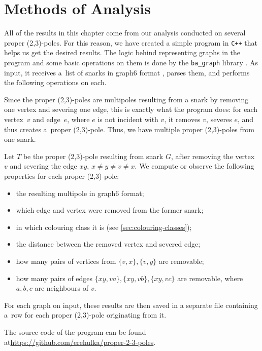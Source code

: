 \section{Methods of Analysis}\label{sec:analysis}

All of the results in this chapter come from our analysis conducted on several proper (2,3)-poles. For this reason, we have created a simple program in \texttt{C++} that helps us get the desired results. The logic behind representing graphs in the program and some basic operations on them is done by the \texttt{ba\_graph} library \cite{ba-graph}. As input, it receives a~list of snarks in graph6 format \cite{mckay_formats}, parses them, and performs the following operations on each.

Since the proper (2,3)-poles are multipoles resulting from a snark by removing one vertex and severing one edge, this is exactly what the program does: for each vertex~$v$ and edge~$e$, where $e$ is not incident with $v$, it removes $v$, severes $e$, and thus creates a~proper (2,3)-pole. Thus, we have multiple proper (2,3)-poles from one snark.

Let $T$ be the proper (2,3)-pole resulting from snark $G$, after removing the vertex $v$ and severing the edge $xy$, $x\neq y\neq v\neq x$. We compute or observe the following properties for each proper (2,3)-pole:

\begin{itemize}
	\item the resulting multipole in graph6 format;
	\item which edge and vertex were removed from the former snark;
	\item in which colouring class it is (see \cref{sec:colouring-classes});
	\item the distance between the removed vertex and severed edge;
	\item how many pairs of vertices from $\{v,x\},\{v,y\}$ are removable;
	\item how many pairs of edges $\{xy, va\}, \{xy, vb\}, \{xy, vc\}$ are removable, where $a,b,c$ are neighbours of $v$.
\end{itemize}

For each graph on input, these results are then saved in a separate file containing a~row for each proper (2,3)-pole originating from it.

The source code of the program can be found at\newline \url{https://github.com/erehulka/proper-2-3-poles}.